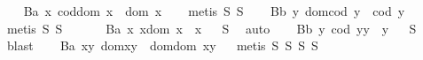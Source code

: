 \begin{isabellebody}
\endisatagproof
{\isafoldproof}%
%
\isadelimproof
%
\endisadelimproof
\isanewline
\ \ \isamarkupfalse%
\ B{}a{\isacharcolon}\ {\isachardoublequoteopen}\isactrlbold {\isasymforall}x{\isachardot}\ cod{\isacharparenleft}dom\ x{\isacharparenright}\ {\isasymcong}\ dom\ x\ {\isachardoublequoteclose}%
\isadelimproof
\ %
\endisadelimproof
%
\isatagproof
{}\isamarkupfalse%
\ {\isacharparenleft}metis\ S{}\ S{}{\isacharparenright}%
\endisatagproof
{\isafoldproof}%
%
\isadelimproof
%
\endisadelimproof
\isanewline
\ \ \isamarkupfalse%
\ B{}b{\isacharcolon}\ {\isachardoublequoteopen}\isactrlbold {\isasymforall}y{\isachardot}\ dom{\isacharparenleft}cod\ y{\isacharparenright}\ {\isasymcong}\ cod\ y{\isachardoublequoteclose}%
\isadelimproof
\ %
\endisadelimproof
%
\isatagproof
{}\isamarkupfalse%
\ {\isacharparenleft}metis\ S{}\ S{}{\isacharparenright}%
\endisatagproof
{\isafoldproof}%
%
\isadelimproof
%
\endisadelimproof
\ \ \isanewline
\ \ \isamarkupfalse%
\ B{}a{\isacharcolon}\ {\isachardoublequoteopen}\isactrlbold {\isasymforall}x{\isachardot}\ x{\isasymcdot}{\isacharparenleft}dom\ x{\isacharparenright}\ {\isasymcong}\ x{\isachardoublequoteclose}%
\isadelimproof
\ %
\endisadelimproof
%
\isatagproof
{}\isamarkupfalse%
\ S{}\ \isamarkupfalse%
\ auto%
\endisatagproof
{\isafoldproof}%
%
\isadelimproof
%
\endisadelimproof
\isanewline
\ \ \isamarkupfalse%
\ B{}b{\isacharcolon}\ {\isachardoublequoteopen}\isactrlbold {\isasymforall}y{\isachardot}\ {\isacharparenleft}cod\ y{\isacharparenright}{\isasymcdot}y\ {\isasymcong}\ y{\isachardoublequoteclose}%
\isadelimproof
\ %
\endisadelimproof
%
\isatagproof
{}\isamarkupfalse%
\ S{}\ \isamarkupfalse%
\ blast%
\endisatagproof
{\isafoldproof}%
%
\isadelimproof
%
\endisadelimproof
\isanewline
\ \ \isamarkupfalse%
\ B{}a{\isacharcolon}\ {\isachardoublequoteopen}\isactrlbold {\isasymforall}x{\isachardot}\isactrlbold {\isasymforall}y{\isachardot}\ dom{\isacharparenleft}x{\isasymcdot}y{\isacharparenright}\ {\isasymcong}\ dom{\isacharparenleft}{\isacharparenleft}dom\ x{\isacharparenright}{\isasymcdot}y{\isacharparenright}{\isachardoublequoteclose}%
\isadelimproof
\ %
\endisadelimproof
%
\isatagproof
{}\isamarkupfalse%
\ {\isacharparenleft}metis\ S{}\ S{}\ S{}\ S{}{\isacharparenright}%

\end{isabellebody}
